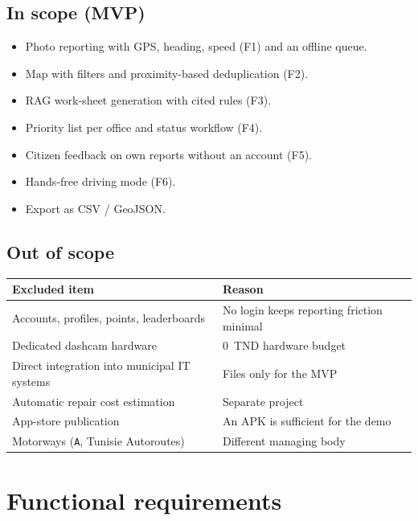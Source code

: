 \documentclass[11pt,a4paper,oneside]{report}
\begin{document}
\section{In scope (MVP)}
\begin{itemize}
\item Photo reporting with GPS, heading, speed (F1) and an offline queue.
\item Map with filters and proximity-based deduplication (F2).
\item RAG work-sheet generation with cited rules (F3).
\item Priority list per office and status workflow (F4).
\item Citizen feedback on own reports without an account (F5).
\item Hands-free driving mode (F6).
\item Export as CSV / GeoJSON.
\end{itemize}

\section{Out of scope}
\begin{longtable}{@{}L{7cm}L{7cm}@{}}
\toprule\textbf{Excluded item} & \textbf{Reason}\\\midrule\endhead
Accounts, profiles, points, leaderboards & No login keeps reporting friction minimal\\
Dedicated dashcam hardware & 0~TND hardware budget\\
Direct integration into municipal IT systems & Files only for the MVP\\
Automatic repair cost estimation & Separate project\\
App-store publication & An APK is sufficient for the demo\\
Motorways (\texttt{A}, Tunisie Autoroutes) & Different managing body\\\bottomrule
\end{longtable}

\chapter{Functional requirements}
\end{document}
